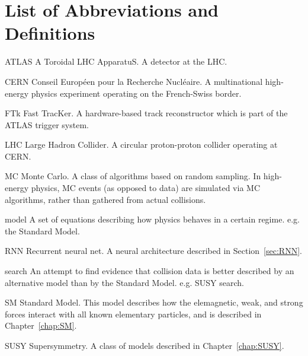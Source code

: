 \chapter*{List of Abbreviations and Definitions}

\begin{symbollist*}
\item[ATLAS] A Toroidal LHC ApparatuS. A detector at the LHC.
\item[CERN] Conseil Européen pour la Recherche Nucléaire. A multinational high-energy physics experiment operating on the French-Swiss border.
\item[FTk] Fast TracKer. A hardware-based track reconstructor which is part of the ATLAS trigger system.
\item[LHC] Large Hadron Collider. A circular proton-proton collider operating at CERN.
\item[MC] Monte Carlo. A class of algorithms based on random sampling. In high-energy physics, MC events (as opposed to data) are simulated via MC algorithms, rather than gathered from actual collisions.
\item[model] A set of equations describing how physics behaves in a certain regime. e.g. the Standard Model.
\item[RNN] Recurrent neural net. A neural architecture described in Section~\ref{sec:RNN}.
\item[search] An attempt to find evidence that collision data is better described by an alternative model than by the Standard Model. e.g. SUSY search.
\item[SM] Standard Model. This model describes how the elemagnetic, weak, and strong forces interact with all known elementary particles, and is described in Chapter~\ref{chap:SM}.
\item[SUSY] Supersymmetry. A class of models described in Chapter~\ref{chap:SUSY}.
\end{symbollist*}
